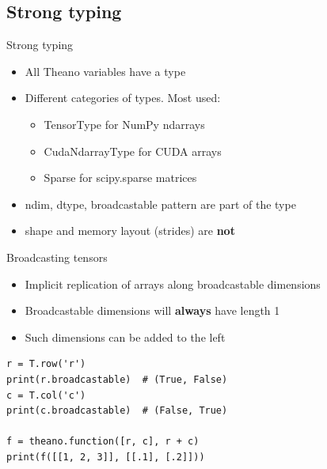 \documentclass[a4paper,9pt]{beamer}
\begin{document}
\subsection{Strong typing}
\begin{frame}{Strong typing}
  \begin{itemize}
    \item All Theano variables have a type
    \item Different categories of types. Most used:
      \begin{itemize}
        \item TensorType for NumPy ndarrays
        \item CudaNdarrayType for CUDA arrays
        \item Sparse for scipy.sparse matrices
      \end{itemize}
    \item ndim, dtype, broadcastable pattern are part of the type
    \item shape and memory layout (strides) are {\bf not}
  \end{itemize}
\end{frame}

\begin{frame}[fragile]{Broadcasting tensors}
  \begin{itemize}
    \item Implicit replication of arrays along broadcastable dimensions
    \item Broadcastable dimensions will {\bf always} have length 1
    \item Such dimensions can be added to the left
  \end{itemize}
  \begin{verbatim}
r = T.row('r')
print(r.broadcastable)  # (True, False)
c = T.col('c')
print(c.broadcastable)  # (False, True)

f = theano.function([r, c], r + c)
print(f([[1, 2, 3]], [[.1], [.2]]))
  \end{verbatim}
\end{frame}
\end{document}
